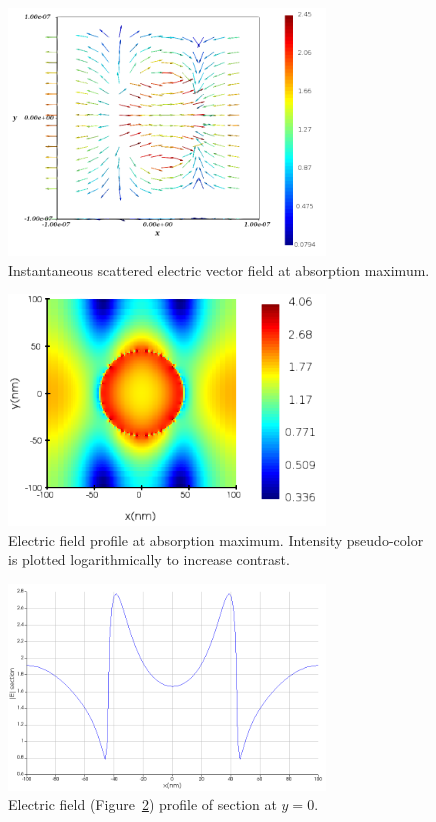 \documentclass[11pt,a4paper]{article}
\begin{document}
\begin{figure}
    \centering
    \includegraphics[width=0.75\textwidth]{vector_plot.png}
    \caption{Instantaneous scattered electric  vector field at absorption maximum.}
    \label{fig:vector}
\end{figure}
\begin{figure}
    \centering
    \includegraphics[width=0.75\textwidth]{E-field hole_hires_periodic_BCs.png}
    \caption{Electric field profile at absorption maximum. Intensity pseudo-color is plotted logarithmically to increase contrast.}
    \label{fig:efield}
\end{figure}
\begin{figure}
    \centering
    \includegraphics[width=0.75\textwidth]{e-section.png}
    \caption{Electric field (Figure~\ref{fig:efield}) profile of section at $y=0$.}
    \label{fig:section}
\end{figure}
\end{document}
